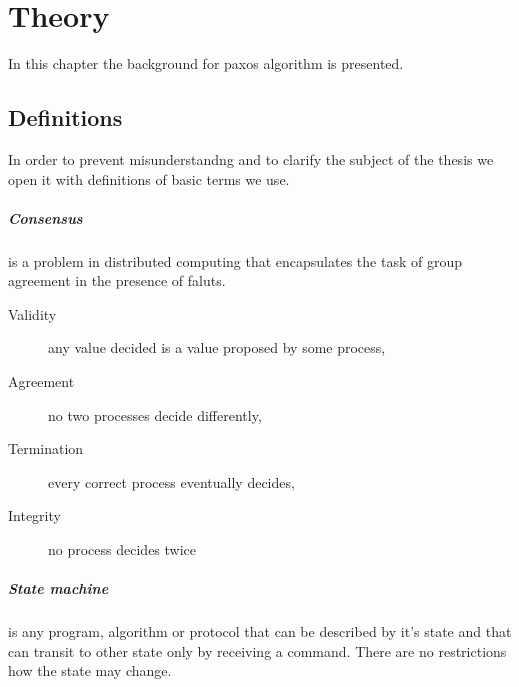 \chapter{Theory}

%

In this chapter the background for paxos algorithm is presented.



\section{Definitions}

In order to prevent misunderstandng and to clarify the subject of the thesis we open it with definitions of
basic %
terms we use.


\paragraph{Consensus}
is a problem in distributed computing that encapsulates the task of group agreement in the presence of faluts.

\begin{description}
    \item[Validity] any value decided is a value proposed by some process,
    \item[Agreement] no two processes decide differently,
    \item[Termination] every correct process eventually decides,
    \item[Integrity] no process decides twice
\end{description}

\paragraph{State machine}
is any program, algorithm or protocol that can be described by it's state and that can transit to other state only by receiving a command.
There are no restrictions how the state may change.

